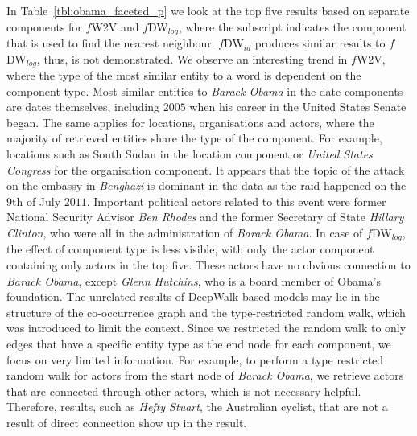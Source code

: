 In Table~\ref{tbl:obama_faceted_p} we look at the top five results based on separate components for $f$W2V and $f$DW$_{log}$, where the subscript indicates the component that is used to find the nearest neighbour. $f$DW$_{id}$ produces similar results to  $f$DW$_{log}$, thus, is not demonstrated. We observe an interesting trend in $f$W2V, where the type of the most similar entity to a word is dependent on the component type. Most similar entities to \emph{Barack Obama} in the date components are dates themselves, including $2005$ when his career in the United States Senate began. The same applies for locations, organisations and actors, where the majority of retrieved entities share the type of the component. For example, locations such as South Sudan in the location component or \emph{United States Congress} for the organisation component. It appears that the topic of the attack on the embassy in \emph{Benghazi} is dominant in the data as the raid happened on the $9$th of July $2011$. Important political actors related to this event were former National Security Advisor \emph{Ben Rhodes} and the former Secretary of State \emph{Hillary Clinton}, who were all in the administration of \emph{Barack Obama}. In case of $f$DW$_{log}$, the effect of component type is less visible, with only the actor component containing only actors in the top five. These actors have no obvious connection to \emph{Barack Obama}, except \emph{Glenn Hutchins}, who is a board member of Obama's foundation. The unrelated results of DeepWalk based models may lie in the structure of the co-occurrence graph and the type-restricted random walk, which was introduced to limit the context. Since we restricted the random walk to only edges that have a specific entity type as the end node for each component, we focus on very limited information. For example, to perform a type restricted random walk for actors from the start node of \emph{Barack Obama}, we retrieve actors that are connected through other actors, which is not necessary helpful. Therefore, results, such as \emph{Hefty Stuart}, the Australian cyclist, that are not a result of direct connection show up in the result.

